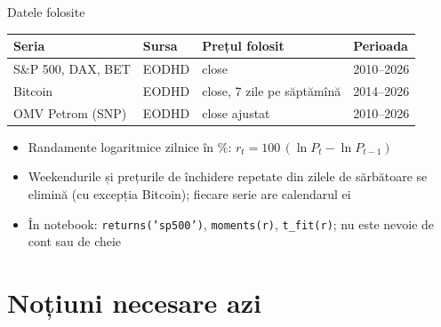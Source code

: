 \begin{frame}{Datele folosite}
\itemsize{\small}
\begin{center}
\footnotesize
\begin{tabular}{llll}
\toprule
\textbf{Seria} & \textbf{Sursa} & \textbf{Prețul folosit} & \textbf{Perioada} \\
\midrule
S\&P 500, DAX, BET & EODHD & close & 2010--2026 \\
Bitcoin & EODHD & close, 7 zile pe săptămînă & 2014--2026 \\
OMV Petrom (SNP) & EODHD & close ajustat & 2010--2026 \\
\bottomrule
\end{tabular}
\end{center}
\begin{itemize}
    \item Randamente logaritmice zilnice în \%: $r_t = 100\,(\ln P_t - \ln P_{t-1})$
    \item Weekendurile și prețurile de închidere repetate din zilele de sărbătoare se elimină (cu excepția Bitcoin); fiecare serie are calendarul ei
    \item În notebook: \texttt{returns('sp500')}, \texttt{moments(r)}, \texttt{t\_fit(r)}; nu este nevoie de cont sau de cheie
\end{itemize}
\end{frame}


\section{Noțiuni necesare azi}


